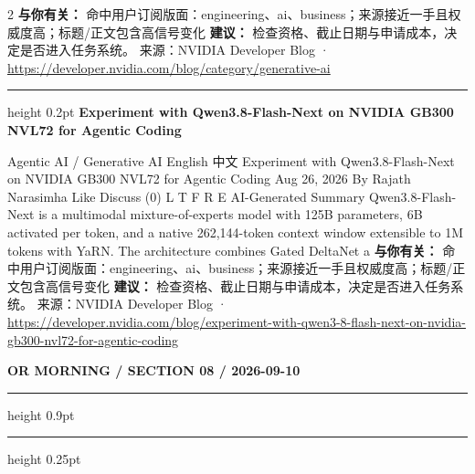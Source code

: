 \documentclass[10.5pt]{ctexart}
\begin{document}
\begin{multicols}{2}
\textbf{与你有关：} 命中用户订阅版面：engineering、ai、business；来源接近一手且权威度高；标题/正文包含高信号变化
\textbf{建议：} 检查资格、截止日期与申请成本，决定是否进入任务系统。
{\footnotesize\color{ormuted} 来源：NVIDIA Developer Blog · \url{https://developer.nvidia.com/blog/category/generative-ai}}
\vspace{2mm}
\hrule height 0.2pt
\vspace{2mm}
{\large\bfseries Experiment with Qwen3.8-Flash-Next on NVIDIA GB300 NVL72 for Agentic Coding}\par
Agentic AI / Generative AI English 中文 Experiment with Qwen3.8-Flash-Next on NVIDIA GB300 NVL72 for Agentic Coding Aug 26, 2026 By Rajath Narasimha Like Discuss (0) L T F R E AI-Generated Summary Qwen3.8-Flash-Next is a multimodal mixture-of-experts model with 125B parameters, 6B activated per token, and a native 262,144-token context window extensible to 1M tokens with YaRN. The architecture combines Gated DeltaNet a
\textbf{与你有关：} 命中用户订阅版面：engineering、ai、business；来源接近一手且权威度高；标题/正文包含高信号变化
\textbf{建议：} 检查资格、截止日期与申请成本，决定是否进入任务系统。
{\footnotesize\color{ormuted} 来源：NVIDIA Developer Blog · \url{https://developer.nvidia.com/blog/experiment-with-qwen3-8-flash-next-on-nvidia-gb300-nvl72-for-agentic-coding}}
\end{multicols}
\newpage
{\small\bfseries OR MORNING / SECTION 08 / 2026-09-10}
\vspace{2mm}
\hrule height 0.9pt
\vspace{1.5mm}
\hrule height 0.25pt
\vspace{4mm}
\end{document}
